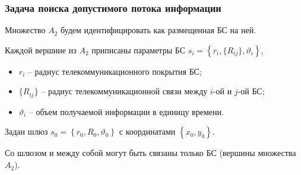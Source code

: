 \begin{frame}
    \frametitle{Задача поиска допустимого потока информации}
    \fontsize{10pt}{7.2}\selectfont
    \justifying

    \bigskip


    Множество $A_2$ будем идентифицировать как размещенная БС на ней.
    
    \bigskip
    
    Каждой вершине из $A_2$ приписаны параметры БС $s_i = \left\{ r_i, \{R_{ij}\},\vartheta_i \right\}$, 
    
    \begin{itemize}
        \item $r_i$ -- радиус телекоммуникационного покрытия БС;
        \item $\{R_{ij}\}$ -- радиус телекоммуникационной связи между $i$-ой и $j$-ой БС;
        \item $\vartheta_i$ -- объем получаемой информации в единицу времени. 
    \end{itemize}
    
    \bigskip
    
    Задан шлюз $s_0 = \left\{ r_0, R_0, \vartheta_0 \right\} $ с координатами $\left\{x_0, y_0 \right\}$. 
    
    Со шлюзом и между собой могут быть связаны только БС (вершины множества $A_2$).

\end{frame}


